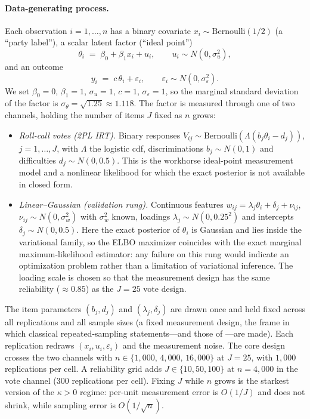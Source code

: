 \paragraph{Data-generating process.}
Each observation $i=1,\dots,n$ has a binary covariate
$x_i\sim\mathrm{Bernoulli}(1/2)$ (a ``party label''), a scalar latent
factor (``ideal point'')
\begin{equation}
  \theta_i \;=\; \beta_0 + \beta_1 x_i + u_i,
  \qquad u_i\sim N(0,\sigma_u^2),
  \label{eq:sim-structural}
\end{equation}
and an outcome
\begin{equation}
  y_i \;=\; c\,\theta_i + \varepsilon_i,
  \qquad \varepsilon_i\sim N(0,\sigma_\varepsilon^2).
  \label{eq:sim-outcome}
\end{equation}
We set $\beta_0=0$, $\beta_1=1$, $\sigma_u=1$, $c=1$,
$\sigma_\varepsilon=1$, so the marginal standard deviation of the factor is
$\sigma_\theta=\sqrt{1.25}\approx1.118$.  The factor is measured through
one of two channels, holding the number of items $J$ fixed as $n$ grows:

\begin{itemize}
\item \emph{Roll-call votes (2PL IRT).}  Binary responses
  $V_{ij}\sim\mathrm{Bernoulli}\!\left(\Lambda(b_j\theta_i-d_j)\right)$,
  $j=1,\dots,J$, with $\Lambda$ the logistic cdf, discriminations
  $b_j\sim N(0,1)$ and difficulties $d_j\sim N(0,0.5)$.  This is the
  workhorse ideal-point measurement model and a nonlinear likelihood for
  which the exact posterior is not available in closed form.
\item \emph{Linear--Gaussian (validation rung).}  Continuous features
  $w_{ij}=\lambda_j\theta_i+\delta_j+\nu_{ij}$,
  $\nu_{ij}\sim N(0,\sigma_w^2)$ with $\sigma_w^2$ known, loadings
  $\lambda_j\sim N(0,0.25^2)$ and intercepts $\delta_j\sim N(0,0.5)$.  Here
  the exact posterior of $\theta_i$ is Gaussian and lies inside the
  variational family, so the ELBO maximizer coincides with the exact
  marginal maximum-likelihood estimator: any failure on this rung would
  indicate an optimization problem rather than a limitation of variational
  inference.  The loading scale is chosen so that the measurement design has
  the same reliability ($\approx0.85$) as the $J=25$ vote design.
\end{itemize}

The item parameters $(b_j,d_j)$ and $(\lambda_j,\delta_j)$ are drawn once
and held fixed across all replications and all sample sizes (a fixed
measurement design, the frame in which classical repeated-sampling
statements---and those of \citealp{BattagliaEtAl2025}---are made).  Each
replication redraws $(x_i,u_i,\varepsilon_i)$ and the measurement noise.
The core design crosses the two channels with
$n\in\{1{,}000,\,4{,}000,\,16{,}000\}$ at $J=25$, with $1{,}000$
replications per cell.  A reliability grid adds
$J\in\{10,50,100\}$ at $n=4{,}000$ in the vote channel ($300$ replications
per cell).  Fixing $J$ while $n$ grows is the starkest version of the
$\kappa>0$ regime: per-unit measurement error is $O(1/J)$ and does not
shrink, while sampling error is $O(1/\sqrt{n})$.

